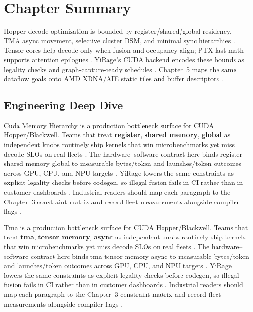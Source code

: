 \section{Chapter Summary}
\label{sec:ch04_summary}

Hopper decode optimization is bounded by register/shared/global residency, TMA async movement, selective cluster DSM, and minimal sync hierarchies \citep{nvidia2022hopper,semianalysis2024tma}.
Tensor cores help decode only when fusion and occupancy align; PTX fast math supports attention epilogues \citep{dao2022flashattention,patel2025llminference,memoryfloor2026}.
YiRage's CUDA backend encodes these bounds as legality checks and graph-capture-ready schedules \citep{patel2025llminference,nvidia2024cudagraphs}.
Chapter~5 maps the same dataflow goals onto AMD XDNA/AIE static tiles and buffer descriptors \citep{amd2024xdna}.


\subsection{Engineering Deep Dive}
\label{sec:ch04_deep_dive}

Cuda Memory Hierarchy is a production bottleneck surface for CUDA Hopper/Blackwell. Teams that treat \textbf{register}, \textbf{shared memory}, \textbf{global} as independent knobs routinely ship kernels that win microbenchmarks yet miss decode SLOs on real fleets \citep{semianalysis2024tma,dlbook}. The hardware--software contract here binds register shared memory global to measurable bytes/token and launches/token outcomes across GPU, CPU, and NPU targets \citep{amd2024xdna,dao2022flashattention}. YiRage lowers the same constraints as explicit legality checks before codegen, so illegal fusion fails in CI rather than in customer dashboards \citep{amd2024aie,kwon2023vllm}. Industrial readers should map each paragraph to the Chapter~3 constraint matrix and record fleet measurements alongside compiler flags \citep{dlbook,nvidia2024cudagraphs}.

Tma is a production bottleneck surface for CUDA Hopper/Blackwell. Teams that treat \textbf{tma}, \textbf{tensor memory}, \textbf{async} as independent knobs routinely ship kernels that win microbenchmarks yet miss decode SLOs on real fleets \citep{amd2024xdna,dao2022flashattention}. The hardware--software contract here binds tma tensor memory async to measurable bytes/token and launches/token outcomes across GPU, CPU, and NPU targets \citep{amd2024aie,kwon2023vllm}. YiRage lowers the same constraints as explicit legality checks before codegen, so illegal fusion fails in CI rather than in customer dashboards \citep{dlbook,nvidia2024cudagraphs}. Industrial readers should map each paragraph to the Chapter~3 constraint matrix and record fleet measurements alongside compiler flags \citep{dao2022flashattention,liu2024deepseekv3}.

